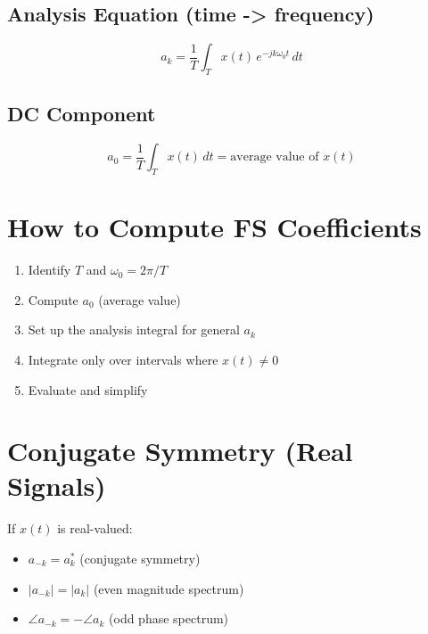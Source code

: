 \documentclass[11pt]{article}
\begin{document}
\subsection*{Analysis Equation (time -> frequency)}

\[a_k = \frac{1}{T} \int_T x(t) \, e^{-jk\omega_0 t} \, dt\]

\subsection*{DC Component}

\[a_0 = \frac{1}{T} \int_T x(t) \, dt = \text{average value of } x(t)\]

\section*{How to Compute FS Coefficients}

\begin{enumerate}
  \item Identify $T$ and $\omega_0 = 2\pi/T$
  \item Compute $a_0$ (average value)
  \item Set up the analysis integral for general $a_k$
  \item Integrate only over intervals where $x(t) \neq 0$
  \item Evaluate and simplify
\end{enumerate}

\section*{Conjugate Symmetry (Real Signals)}

If $x(t)$ is real-valued:
\begin{itemize}
  \item $a_{-k} = a_k^*$ (conjugate symmetry)
  \item $|a_{-k}| = |a_k|$ (even magnitude spectrum)
  \item $\angle a_{-k} = -\angle a_k$ (odd phase spectrum)
\end{itemize}
\end{document}
